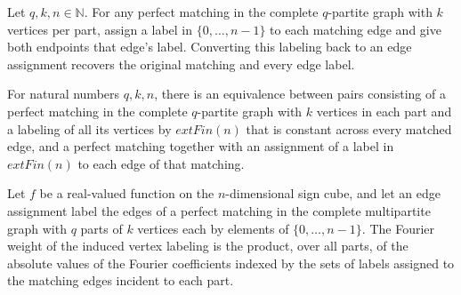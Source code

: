 \begin{theorem}
\label{FABL.graphMatchingLabelingToEdgeAssignment_leftInverse}
\leanok
{}
Let $q,k,n\in\mathbb{N}$. For any perfect matching in the complete $q$-partite graph
with $k$ vertices per part, assign a label in $\{0,\ldots,n-1\}$ to each matching edge
and give both endpoints that edge's label. Converting this labeling back to an edge
assignment recovers the original matching and every edge label.
\end{theorem}

\begin{definition}
\label{FABL.graphMatchingLabelingEquivEdgeAssignment}
\leanok
{}
For natural numbers $q,k,n$, there is an equivalence between pairs consisting of a
perfect matching in the complete $q$-partite graph with $k$ vertices in each part and a
labeling of all its vertices by $	ext{Fin}(n)$ that is constant across every matched
edge, and a perfect matching together with an assignment of a label in $	ext{Fin}(n)$ to
each edge of that matching.
\end{definition}

\begin{theorem}
\label{FABL.graphMatchingEdgeAssignmentToLabeling_weight}
\leanok
{}
Let $f$ be a real-valued function on the $n$-dimensional sign cube, and let an edge
assignment label the edges of a perfect matching in the complete multipartite graph with
$q$ parts of $k$ vertices each by elements of $\{0,\ldots,n-1\}$. The Fourier weight of
the induced vertex labeling is the product, over all parts, of the absolute values of
the Fourier coefficients indexed by the sets of labels assigned to the matching edges
incident to each part.
\end{theorem}

